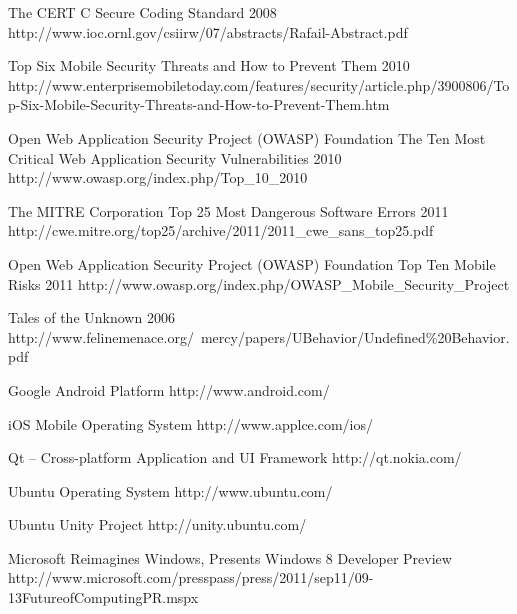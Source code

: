 \begin{thebibliography}{9}
		{
			\biband
			}
		{The {CERT} {C} Secure Coding Standard}
		{2008}
		{http://www.ioc.ornl.gov/csiirw/07/abstracts/Rafail-Abstract.pdf}
		
		{}
		{Top Six Mobile Security Threats and How to Prevent Them}
		{2010}
		{http://www.enterprisemobiletoday.com/features/security/article.php/3900806/Top-Six-Mobile-Security-Threats-and-How-to-Prevent-Them.htm}
		
		{Open Web Application Security Project (OWASP) Foundation}
		{The Ten Most Critical Web Application Security Vulnerabilities}
		{2010}
		{http://www.owasp.org/index.php/Top_10_2010}
	
		{The MITRE Corporation}
		{Top 25 Most Dangerous Software Errors}
		{2011}
		{http://cwe.mitre.org/top25/archive/2011/2011_cwe_sans_top25.pdf}
		
		{Open Web Application Security Project (OWASP) Foundation}
		{Top Ten Mobile Risks}
		{2011}
		{http://www.owasp.org/index.php/OWASP_Mobile_Security_Project}


		{Tales of the Unknown}
		{2006}
		{http://www.felinemenace.org/~mercy/papers/UBehavior/Undefined\%20Behavior.pdf}
	

		{Google Android Platform}
		{http://www.android.com/}
	
		{iOS Mobile Operating System}
		{http://www.applce.com/ios/}
		
		{Qt -- Cross-platform Application and UI Framework}
		{http://qt.nokia.com/}
	
		{Ubuntu Operating System}
		{http://www.ubuntu.com/}
		
		{Ubuntu Unity Project}
		{http://unity.ubuntu.com/}
	
		{Microsoft Reimagines Windows, Presents Windows 8 Developer Preview}
		{http://www.microsoft.com/presspass/press/2011/sep11/09-13FutureofComputingPR.mspx}

\end{thebibliography}